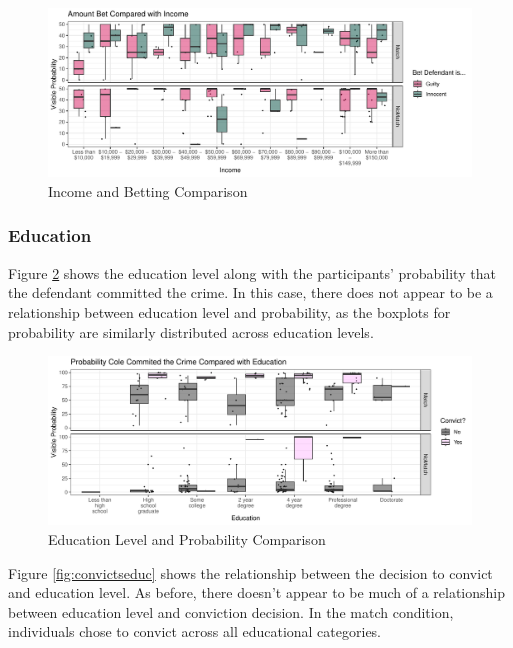 \documentclass[print]{nuthesis}
\begin{document}
\begin{figure}

{\centering \includegraphics[width=\linewidth]{thesis_files/figure-latex/incomebet-1} 

}

\caption{Income and Betting Comparison}\label{fig:incomebet}
\end{figure}

\hypertarget{education}{%
\subsubsection{Education}\label{education}}

Figure \ref{fig:probeduc} shows the education level along with the participants' probability that the defendant committed the crime.
In this case, there does not appear to be a relationship between education level and probability, as the boxplots for probability are similarly distributed across education levels.

\begin{figure}

{\centering \includegraphics[width=\linewidth]{thesis_files/figure-latex/probeduc-1} 

}

\caption{Education Level and Probability Comparison}\label{fig:probeduc}
\end{figure}

Figure \ref{fig:convictseduc} shows the relationship between the decision to convict and education level.
As before, there doesn't appear to be much of a relationship between education level and conviction decision.
In the match condition, individuals chose to convict across all educational categories.
\end{document}
